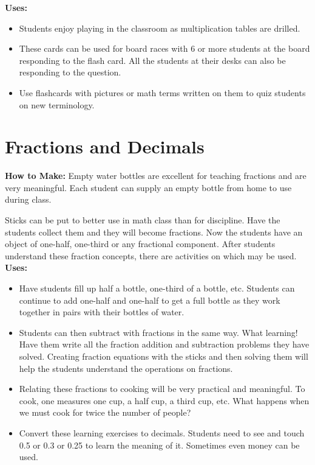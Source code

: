 \noindent\textbf{Uses:}
\begin{itemize}
\item Students enjoy playing  in the classroom as multiplication tables are drilled.
\item These cards can be used for board races with 6 or more students at the board responding to the flash card. All the students at their desks can also be responding to the question.
\item Use flashcards with pictures or math terms written on them to quiz students on new terminology.
\end{itemize}

\section{Fractions and Decimals} \label{fracsanddecs}
\textbf{How to Make:} Empty water bottles are excellent for teaching fractions and are very meaningful. Each student can supply an empty bottle from home to use during class.

Sticks can be put to better use in math class than for discipline. Have the students collect them and they will become fractions. Now the students have an object of one-half, one-third or any fractional component. After students understand these fraction concepts, there are activities on  which may be used. \\

\noindent\textbf{Uses:}
\begin{itemize}
\item Have students fill up half a bottle, one-third of a bottle, etc. Students can continue to add one-half and one-half to get a full bottle as they work together in pairs with their bottles of water.
\item Students can then subtract with fractions in the same way. What learning! Have them write all the fraction addition and subtraction problems they have solved. Creating fraction equations with the sticks and then solving them will help the students understand the operations on fractions.
\item Relating these fractions to cooking will be very practical and meaningful. To cook, one measures one cup, a half cup, a third cup, etc. What happens when we must cook for twice the number of people?
\item Convert these learning exercises to decimals. Students need to see and touch 0.5 or 0.3 or 0.25 to learn the meaning of it. Sometimes even money can be used.
\end{itemize}

